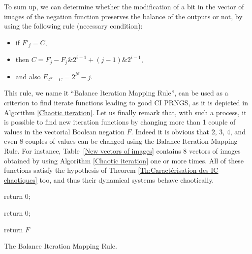 \documentclass[conference]{IEEEtran}
\begin{document}
To sum up, we can determine whether the modification of a bit in the vector of images of the negation function preserves the balance of the outputs or not, by using the following rule (necessary condition):
\begin{itemize}
\item if $F'_j = C$,
\item then $C = F_j-F_j\&2^{i-1}+(j-1)\&2^{i-1}$,
\item and also $F_{2^N-C} = 2^N-j$.
\end{itemize}

This rule, we name it ``Balance Iteration Mapping Rule'', can be used as a criterion to find iterate functions leading to good CI PRNGS, as it is depicted in Algorithm \ref{Chaotic iteration}.
Let us finally remark that, with such a process, it is possible to find new iteration functions by changing more than 1 couple of values in the vectorial Boolean negation $F$. Indeed it is obvious that 2, 3, 4, and even 8 couples of values can be changed using the Balance Iteration Mapping Rule.
For instance, Table~\ref{New vectors of images} contains 8 vectors of images obtained by using Algorithm \ref{Chaotic iteration} one or more times. All of these functions satisfy the hypothesis of Theorem \ref{Th:Caractérisation   des   IC   chaotiques} too, and thus their dynamical systems behave chaotically.






\begin{algorithm}
\SetAlgoLined
{}
{
{

{

{
return 0;
}

}

}

{
return 0;
}

}
return $F$\;
\caption{The Balance Iteration Mapping Rule.}
\label{Chaotic iteration}
\end{algorithm}
\end{document}
